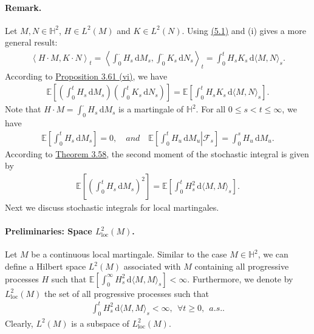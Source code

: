 \documentclass{article}
\numberwithin{equation}{section}
\newcommand{\E}{\mathbb{E}}
\renewcommand{\d}{\mathrm{d}}
\theoremstyle{plain}
\theoremstyle{definition}
\begin{document}
\paragraph{Remark.} Let $M,N\in\mathbb{H}^2$, $H\in L^2(M)$ and $K\in L^2(N)$. Using \hyperref[eq:5.1]{(5.1)} and (i) gives a more general result:
\begin{align*}
	\left\langle H\cdot M, K\cdot N\right\rangle_t = \left\langle \int_0^\cdot H_s\,\d M_s, \int_0^\cdot K_s\,\d N_s\right\rangle_t = \int_0^t H_sK_s\,\d \langle M,N\rangle_s.
\end{align*}
According to \hyperref[prop:3.61]{Proposition 3.61 (vi)}, we have
\begin{align*}
	\E\left[\left(\int_0^t H_s\,\d M_s\right)\left(\int_0^t K_s\,\d N_s\right)\right]=\E\left[\int_0^t H_sK_s\,\d \langle M,N\rangle_s\right].
\end{align*}
Note that $H\cdot M = \int_0^\cdot H_s\,\d M_s$ is a martingale of $\mathbb{H}^2$. For all $0\leq s < t\leq \infty$, we have
\begin{align*}
	\E\left[\int_0^t H_s\,\d M_s\right] = 0,\quad \textit{and}\quad \E\left[\left.\int_0^t H_u\,\d M_u\right|\mathscr{F}_s\right]=\int_0^s H_u\,\d M_u.
\end{align*}
According to \hyperref[thm:3.58]{Theorem 3.58}, the second moment of the stochastic integral is given by
\begin{align*}
	\E\left[\left(\int_0^t H_s\,\d M_s\right)^2\right]=\E\left[\int_0^t H_s^2\,\d \langle M,M\rangle_s\right].
\end{align*}
Next we discuss stochastic integrals for local martingales.
\newpage
\paragraph{Preliminaries: Space $L^2_{\mathrm{loc}}(M)$.}  Let $M$ be a continuous local martingale. Similar to the case $M\in\mathbb{H}^2$, we can define a Hilbert space $L^2(M)$ associated with $M$ containing all progressive processes $H$ such that $\E\left[\int_0^\infty H_s^2\,\d \langle M,M\rangle_s\right]<\infty$. Furthermore, we denote by $L^2_{\mathrm{loc}}(M)$ the set of all progressive processes such that
\begin{align*}
	\int_0^t H_s^2\,\d \langle M,M\rangle_s <\infty,\ \ \forall t\geq 0,\ \ \textit{a.s.}.
\end{align*}
Clearly, $L^2(M)$ is a subspace of $L^2_{\mathrm{loc}}(M)$.
\end{document}
